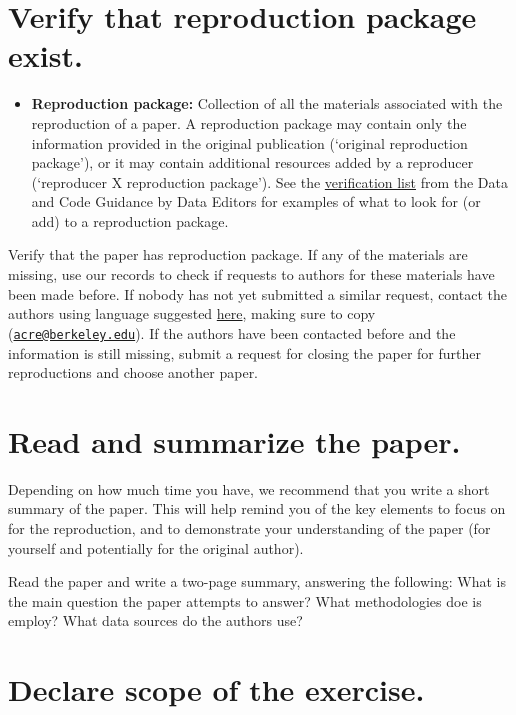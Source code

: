\documentclass[]{book}
\providecommand{\tightlist}{%
  \setlength{\itemsep}{0pt}\setlength{\parskip}{0pt}}
\begin{document}
\hypertarget{verify-rep-mat}{%
\section{Verify that reproduction package exist.}\label{verify-rep-mat}}

\begin{itemize}
\tightlist
\item
  \textbf{Reproduction package:} Collection of all the materials associated with the reproduction of a paper. A reproduction package may contain only the information provided in the original publication (`original reproduction package'), or it may contain additional resources added by a reproducer (`reproducer X reproduction package'). See the \href{https://social-science-data-editors.github.io/guidance/Verification_guidance.html}{verification list} from the Data and Code Guidance by Data Editors for examples of what to look for (or add) to a reproduction package.
\end{itemize}

Verify that the paper has reproduction package. If any of the materials are missing, use our records to check if requests to authors for these materials have been made before. If nobody has not yet submitted a similar request, contact the authors using language suggested \protect\hyperlink{for-reproducers-contacting-the-authors-of-the-original-study}{here}, making sure to copy (\href{mailto:acre@berkeley.edu}{\nolinkurl{acre@berkeley.edu}}). If the authors have been contacted before and the information is still missing, submit a request for closing the paper for further reproductions and choose another paper.

\hypertarget{read-sum}{%
\section{Read and summarize the paper.}\label{read-sum}}

Depending on how much time you have, we recommend that you write a short summary of the paper. This will help remind you of the key elements to focus on for the reproduction, and to demonstrate your understanding of the paper (for yourself and potentially for the original author).

Read the paper and write a two-page summary, answering the following: What is the main question the paper attempts to answer? What methodologies doe is employ? What data sources do the authors use?

\hypertarget{declare-scope-of-the-exercise.}{%
\section{Declare scope of the exercise.}\label{declare-scope-of-the-exercise.}}
\end{document}
